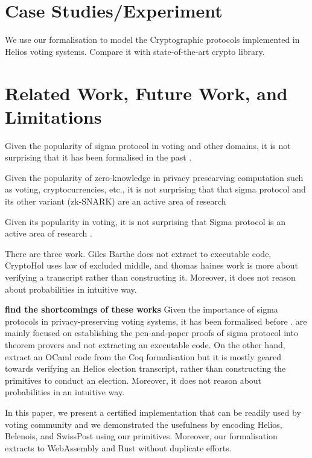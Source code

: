 \documentclass[conference,compsoc]{IEEEtran}
\begin{document}
\section{Case Studies/Experiment}
  We use our formalisation to model the Cryptographic protocols implemented in 
  Helios voting systems. Compare it with state-of-the-art 
  crypto library. 


\section{Related Work, Future Work, and Limitations}
  Given the popularity of sigma protocol in voting 
  and other domains, it is not surprising that it has 
  been formalised in the past \cite{5552642,9519460,
  butler2021formalising,10.1145/3319535.3354247,287095,almeida2010certifying,10221929,
  10.1145/3594735}. 

  Given the popularity of zero-knowledge in 
  privacy presearving computation such as voting, cryptocurrencies, 
  etc., it is not surprising that that sigma protocol and its other 
  variant (zk-SNARK) are an active area of research 

  Given its popularity in voting, it is not surprising that 
  Sigma protocol is an active area of research \cite{5552642}. 

  There are three work. Giles Barthe does not extract to executable code, 
  CryptoHol uses law of excluded middle, and thomas haines work is more about 
  verifying a transcript rather than constructing it. Moreover, 
  it does not reason about probabilities in intuitive way. 

\textbf{find the shortcomings of these works}
Given the importance of sigma protocols in privacy-preserving voting systems,
it has been formalised before  \cite{5552642,butler2019formalisation,10.1145/3319535.3354247}. 
\cite{5552642,butler2019formalisation} are mainly focused on establishing the 
pen-and-paper proofs of sigma protocol into theorem provers and not extracting an executable code.
On the other hand, \cite{10.1145/3319535.3354247} extract an OCaml code from the Coq 
formalisation but it is mostly geared towards verifying an Helios election transcript, 
rather than constructing the primitives to conduct an election. Moreover, 
it does not reason about probabilities in an intuitive way.


  In this paper, we present a certified implementation 
  that can be readily used by voting community and 
  we demonstrated the usefulness by encoding Helios, 
  Belenois, and SwissPost using our primitives. 
  Moreover, our formalisation extracts to WebAssembly and 
  Rust without duplicate efforts. 









\end{document}
